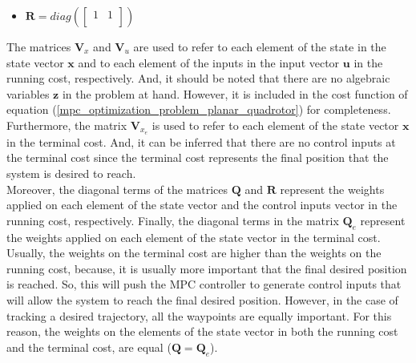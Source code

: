 \documentclass{thesisreport}
\begin{document}
\begin{itemize}
                \item $\bm{R}= 
                diag(\begin{bmatrix}
            	1 & 1 \\
            	\end{bmatrix}) $
            \end{itemize}

\newpage

The matrices $\bm{V}_x$ and  $\bm{V}_u$ are used to refer to each element of the state in the state vector $\bm{x}$ and to each element of the inputs in the input vector $\bm{u}$ in the running cost, respectively. And, it should be noted that there are no algebraic variables $\bm{z}$ in the problem at hand. However, it is included in the cost function of equation (\ref{mpc_optimization_problem_planar_quadrotor}) for completeness. Furthermore, the matrix $\bm{V}_{x_e}$ is used to refer to each element of the state vector $\bm{x}$ in the terminal cost. And, it can be inferred that there are no control inputs at the terminal cost since the terminal cost represents the final position that the system is desired to reach. \\

Moreover, the diagonal terms of the matrices $\bm{Q}$ and $\bm{R}$ represent the weights applied on each element of the state vector and the control inputs vector in the running cost, respectively. Finally, the diagonal terms in the matrix $\bm{Q}_e$ represent the weights applied on each element of the state vector in the terminal cost. Usually, the weights on the terminal cost are higher than the weights on the running cost, because, it is usually more important that the final desired position is reached. So, this will push the MPC controller to generate control inputs that will allow the system to reach the final desired position. However, in the case of tracking a desired trajectory, all the waypoints are equally important. For this reason, the weights on the elements of the state vector in both the running cost and the terminal cost, are equal ($\bm{Q}=\bm{Q}_e$). \\
\end{document}
